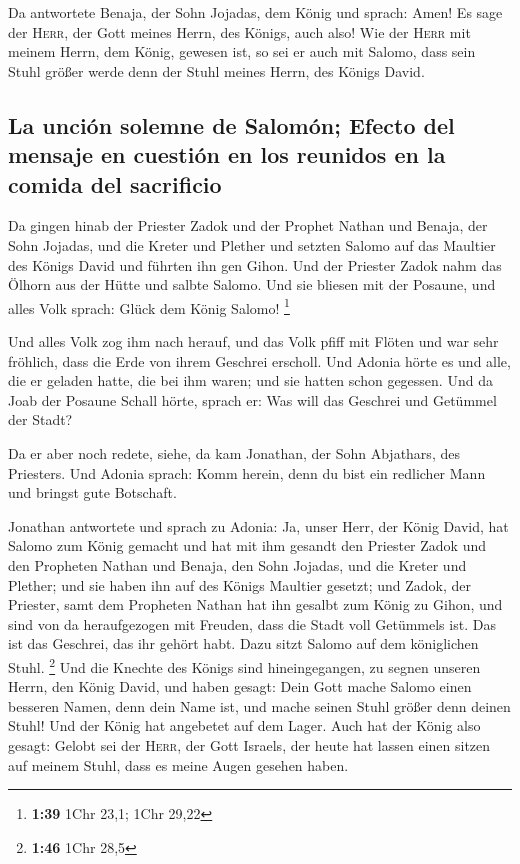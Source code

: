 Da antwortete Benaja, der Sohn Jojadas, dem König und
sprach: Amen! Es sage der \textsc{Herr}, der Gott meines Herrn, des
Königs, auch also!  Wie der \textsc{Herr} mit meinem
Herrn, dem König, gewesen ist, so sei er auch mit Salomo, dass sein
Stuhl größer werde denn der Stuhl meines Herrn, des Königs David.

\hypertarget{la-unciuxf3n-solemne-de-salomuxf3n-efecto-del-mensaje-en-cuestiuxf3n-en-los-reunidos-en-la-comida-del-sacrificio}{%
\subsection{La unción solemne de Salomón; Efecto del mensaje en cuestión
en los reunidos en la comida del
sacrificio}\label{la-unciuxf3n-solemne-de-salomuxf3n-efecto-del-mensaje-en-cuestiuxf3n-en-los-reunidos-en-la-comida-del-sacrificio}}

 Da gingen hinab der Priester Zadok und der Prophet
Nathan und Benaja, der Sohn Jojadas, und die Kreter und Plether und
setzten Salomo auf das Maultier des Königs David und führten ihn gen
Gihon.  Und der Priester Zadok nahm das Ölhorn aus der
Hütte und salbte Salomo. Und sie bliesen mit der Posaune, und alles Volk
sprach: Glück dem König Salomo! \footnote{\textbf{1:39} 1Chr 23,1; 1Chr
  29,22}

 Und alles Volk zog ihm nach herauf, und das Volk pfiff
mit Flöten und war sehr fröhlich, dass die Erde von ihrem Geschrei
erscholl.  Und Adonia hörte es und alle, die er geladen
hatte, die bei ihm waren; und sie hatten schon gegessen. Und da Joab der
Posaune Schall hörte, sprach er: Was will das Geschrei und Getümmel der
Stadt?

 Da er aber noch redete, siehe, da kam Jonathan, der Sohn
Abjathars, des Priesters. Und Adonia sprach: Komm herein, denn du bist
ein redlicher Mann und bringst gute Botschaft.

 Jonathan antwortete und sprach zu Adonia: Ja, unser
Herr, der König David, hat Salomo zum König gemacht  und
hat mit ihm gesandt den Priester Zadok und den Propheten Nathan und
Benaja, den Sohn Jojadas, und die Kreter und Plether; und sie haben ihn
auf des Königs Maultier gesetzt;  und Zadok, der
Priester, samt dem Propheten Nathan hat ihn gesalbt zum König zu Gihon,
und sind von da heraufgezogen mit Freuden, dass die Stadt voll Getümmels
ist. Das ist das Geschrei, das ihr gehört habt.  Dazu
sitzt Salomo auf dem königlichen Stuhl. \footnote{\textbf{1:46} 1Chr
  28,5}  Und die Knechte des Königs sind hineingegangen,
zu segnen unseren Herrn, den König David, und haben gesagt: Dein Gott
mache Salomo einen besseren Namen, denn dein Name ist, und mache seinen
Stuhl größer denn deinen Stuhl! Und der König hat angebetet auf dem
Lager.  Auch hat der König also gesagt: Gelobt sei der
\textsc{Herr}, der Gott Israels, der heute hat lassen einen sitzen auf
meinem Stuhl, dass es meine Augen gesehen haben.

